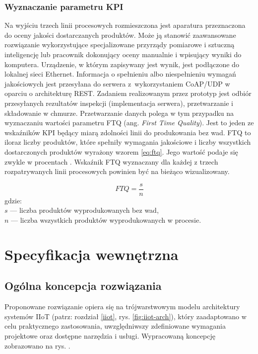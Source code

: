 \documentclass[a4paper, 12pt, twoside]{article}
\begin{document}
\subsubsection{Wyznaczanie parametru KPI}

Na wyjściu trzech linii procesowych rozmieszczona jest aparatura przeznaczona
do oceny jakości dostarczanych produktów. Może ją stanowić zaawansowane
rozwiązanie wykorzystujące specjalizowane przyrządy pomiarowe i sztuczną inteligencję lub
pracownik dokonujący oceny manualnie i wpisujący wyniki do komputera. Urządzenie,
w którym zapisywany jest wynik, jest podłączone do lokalnej sieci Ethernet.
Informacja o spełnieniu albo niespełnieniu wymagań jakościowych jest przesyłana
do serwera z~wykorzystaniem CoAP/UDP w oparciu o architekturę REST. Zadaniem
realizowanym przez prototyp jest odbiór przesyłanych rezultatów inspekcji
(implementacja serwera), przetwarzanie i składowanie w chmurze. Przetwarzanie
danych polega w tym przypadku na wyznaczaniu wartości parametru FTQ
(ang. \emph{First Time Quality}). Jest to jeden ze wskaźników KPI będący miarą
zdolności linii do produkowania bez wad. FTQ to iloraz liczby produktów,
które spełniły wymagania jakościowe i liczby wszystkich dostarczonych produktów
wyrażony wzorem \eqref{eq:ftq}.
Jego wartość podaje się zwykle w procentach \cite{isp}. Wskaźnik FTQ
wyznaczany dla każdej z trzech rozpatrywanych linii procesowych powinien być na bieżąco wizualizowany.

\begin{equation}
      FTQ = \frac{s}{n}\label{eq:ftq}
\end{equation}
\noindent gdzie: \\
$s$ --- liczba produktów wyprodukowanych bez wad,\\
$n$ --- liczba wszystkich produktów wyprodukowanych w procesie.



\section{Specyfikacja wewnętrzna}\label{spec-zew}

\subsection{Ogólna koncepcja rozwiązania}\label{ogolna-koncepcja}

Proponowane rozwiązanie opiera się na trójwarstwowym modelu architektury
systemów IIoT (patrz: rozdział \ref{iiot}, rys. \ref{fig:iiot-arch}), który
zaadaptowano w celu praktycznego zastosowania, uwzględniwszy zdefiniowane
wymagania projektowe oraz dostępne narzędzia i usługi. Wypracowaną koncepcję
zobrazowano na rys. .
\end{document}
